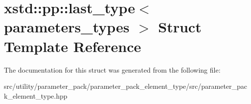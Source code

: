 \hypertarget{structxstd_1_1pp_1_1last__type}{\section{xstd\-:\-:pp\-:\-:last\-\_\-type$<$ parameters\-\_\-types $>$ Struct Template Reference}
\label{structxstd_1_1pp_1_1last__type}
}


The documentation for this struct was generated from the following file\-:\begin{DoxyCompactItemize}
\item 
src/utility/parameter\-\_\-pack/parameter\-\_\-pack\-\_\-element\-\_\-type/src/parameter\-\_\-pack\-\_\-element\-\_\-type.\-hpp\end{DoxyCompactItemize}
